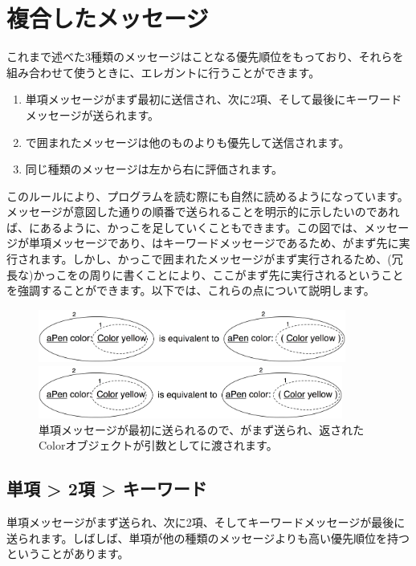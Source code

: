 \documentclass[a4paper,10pt,twoside]{book}
\begin{document}
\section{複合したメッセージ}
これまで述べた3種類のメッセージはことなる優先順位をもっており、それらを組み合わせて使うときに、エレガントに行うことができます。

\begin{enumerate}
\item 単項メッセージがまず最初に送信され、次に2項、そして最後にキーワードメッセージが送られます。
\item {}で囲まれたメッセージは他のものよりも優先して送信されます。
\item 同じ種類のメッセージは左から右に評価されます。
\end{enumerate}

このルールにより、プログラムを読む際にも自然に読めるようになっています。メッセージが意図した通りの順番で送られることを明示的に示したいのであれば、にあるように、かっこを足していくこともできます。この図では、メッセージが単項メッセージであり、はキーワードメッセージであるため、がまず先に実行されます。しかし、かっこで囲まれたメッセージがまず実行されるため、(冗長な)かっこをの周りに書くことにより、ここがまず先に実行されるということを強調することができます。以下では、これらの点について説明します。

\begin{figure}[ht]
\ifluluelse
	{\centerline{\includegraphics[width=0.9\textwidth]{uKeyUn}} }
	{\centerline{\includegraphics[width=10cm]{uKeyUn}} }
\caption{単項メッセージが最初に送られるので、がまず送られ、返されたColorオブジェクトが引数としてに渡されます。}
\end{figure}

\subsection*{単項 > 2項 > キーワード}
単項メッセージがまず送られ、次に2項、そしてキーワードメッセージが最後に送られます。しばしば、単項が他の種類のメッセージよりも高い優先順位を持つということがあります。
\end{document}
